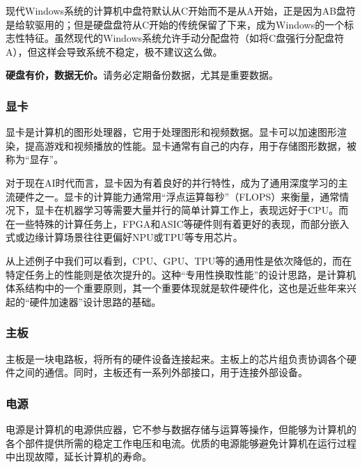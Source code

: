 \begin{note}
  现代Windows系统的计算机中盘符默认从C开始而不是从A开始，正是因为AB盘符是给软驱用的；但是硬盘盘符从C开始的传统保留了下来，成为Windows的一个标志性特征。虽然现代的Windows系统允许手动分配盘符（如将C盘强行分配盘符A），但这样会导致系统不稳定，极不建议这么做。
\end{note}

\begin{caution}
\textbf{硬盘有价，数据无价。}请务必定期备份数据，尤其是重要数据。
\end{caution}

\subsubsection{显卡}

显卡是计算机的图形处理器，它用于处理图形和视频数据。显卡可以加速图形渲染，提高游戏和视频播放的性能。显卡通常有自己的内存，用于存储图形数据，被称为“显存”。

对于现在AI时代而言，显卡因为有着良好的并行特性，成为了通用深度学习的主流硬件之一。显卡的计算能力通常用“浮点运算每秒”（FLOPS）来衡量，通常情况下，显卡在机器学习等需要大量并行的简单计算工作上，表现远好于CPU。而在一些特殊的计算任务上，FPGA和ASIC等硬件则有着更好的表现，而部分嵌入式或边缘计算场景往往更偏好NPU或TPU等专用芯片。

\begin{tip}
  从上述例子中我们可以看到，CPU、GPU、TPU等的通用性是依次降低的，而在特定任务上的性能则是依次提升的。这种“专用性换取性能”的设计思路，是计算机体系结构中的一个重要原则，其一个重要体现就是软件硬件化，这也是近些年来兴起的“硬件加速器”设计思路的基础。
\end{tip}

\subsubsection{主板}

主板是一块电路板，将所有的硬件设备连接起来。主板上的芯片组负责协调各个硬件之间的通信。同时，主板还有一系列外部接口，用于连接外部设备。

\subsubsection{电源}

电源是计算机的电源供应器，它不参与数据存储与运算等操作，但能够为计算机的各个部件提供所需的稳定工作电压和电流。优质的电源能够避免计算机在运行过程中出现故障，延长计算机的寿命。

